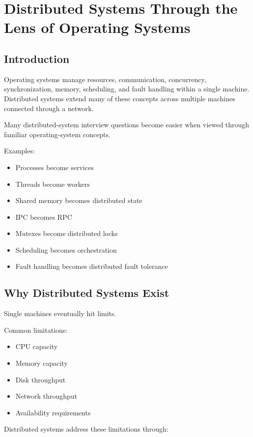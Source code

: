 \chapter{Distributed Systems Through the Lens of Operating Systems}

\section{Introduction}

Operating systems manage resources, communication, concurrency, synchronization, memory, scheduling, and fault handling within a single machine. Distributed systems extend many of these concepts across multiple machines connected through a network.

Many distributed-system interview questions become easier when viewed through familiar operating-system concepts.

Examples:

\begin{itemize}
\item Processes become services
\item Threads become workers
\item Shared memory becomes distributed state
\item IPC becomes RPC
\item Mutexes become distributed locks
\item Scheduling becomes orchestration
\item Fault handling becomes distributed fault tolerance
\end{itemize}

\section{Why Distributed Systems Exist}

Single machines eventually hit limits.

Common limitations:

\begin{itemize}
\item CPU capacity
\item Memory capacity
\item Disk throughput
\item Network throughput
\item Availability requirements
\end{itemize}

Distributed systems address these limitations through:

